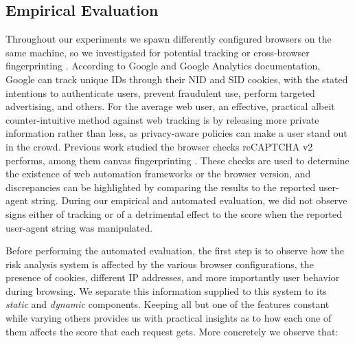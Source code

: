 \subsection{Empirical Evaluation}
\label{sub:empirical}

Throughout our experiments we spawn differently configured browsers on the same machine, so we investigated for potential tracking or cross-browser fingerprinting \cite{boda2011user}.
According to Google and Google Analytics documentation, Google can track unique IDs through their NID and SID cookies, with the stated intentions to authenticate users, prevent fraudulent use, perform targeted advertising, and others.
For the average web user, an effective, practical albeit counter-intuitive method against web tracking is by releasing more private information rather than less, as privacy-aware policies can make a user stand out in the crowd.
Previous work \cite{sivakorn2016robot} studied the browser checks reCAPTCHA v2 performs, among them canvas fingerprinting \cite{mowery2012pixel}.
These checks are used to determine the existence of web automation frameworks or the browser version, and discrepancies can be highlighted by comparing the results to the reported user-agent string.
During our empirical and automated evaluation, we did not observe signs either of tracking or of a detrimental effect to the score when the reported user-agent string was manipulated.

Before performing the automated evaluation, the first step is to observe how the risk analysis system is affected by the various browser configurations, the presence of cookies, different IP addresses, and more importantly user behavior during browsing.
We separate this information supplied to this system to its \emph{static} and \emph{dynamic} components.
Keeping all but one of the features constant while varying others provides us with practical insights as to how each one of them affects the score that each request gets.
More concretely we observe that:

